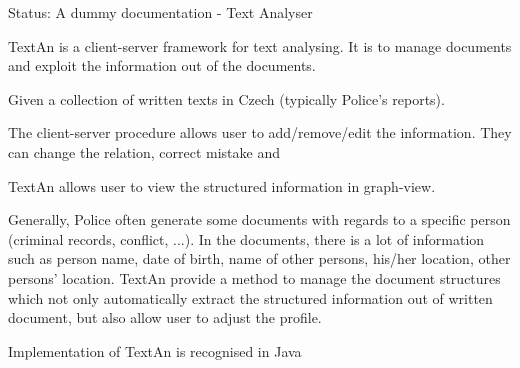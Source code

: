 Status: A dummy documentation - Text Analyser

TextAn is a client-server framework for text analysing. It is to manage documents and exploit the information out of the documents.

Given a collection of written texts in Czech (typically Police's reports).  

The client-server procedure allows user to add/remove/edit the information. They can change the relation, correct mistake and

TextAn allows user to view the structured information in graph-view. 

Generally, Police often generate some documents with regards to a specific person (criminal records, conflict, ...). In the documents, there is a lot of information such as person name, date of birth, name of other persons, his/her location, other persons' location. TextAn provide a method to manage the document structures which not only automatically extract the structured information out of written document, but also allow user to adjust the profile.

Implementation of TextAn is recognised in Java